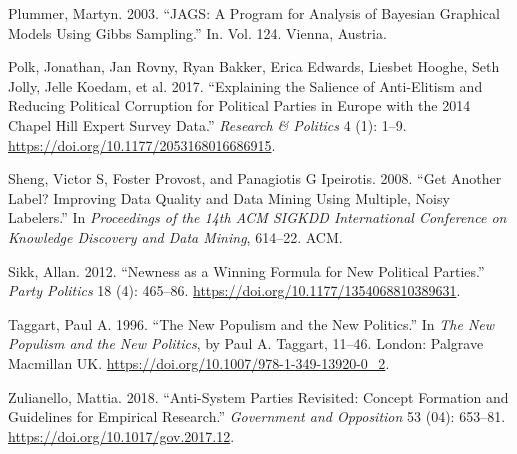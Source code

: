 \documentclass[12pt,]{article}
\begin{document}
\leavevmode\hypertarget{ref-plummer_jags_2003}{}%
Plummer, Martyn. 2003. ``JAGS: A Program for Analysis of Bayesian
Graphical Models Using Gibbs Sampling.'' In. Vol. 124. Vienna, Austria.

\leavevmode\hypertarget{ref-polk_explaining_2017}{}%
Polk, Jonathan, Jan Rovny, Ryan Bakker, Erica Edwards, Liesbet Hooghe,
Seth Jolly, Jelle Koedam, et al. 2017. ``Explaining the Salience of
Anti-Elitism and Reducing Political Corruption for Political Parties in
Europe with the 2014 Chapel Hill Expert Survey Data.'' \emph{Research \&
Politics} 4 (1): 1--9. \url{https://doi.org/10.1177/2053168016686915}.

\leavevmode\hypertarget{ref-sheng_get_2008}{}%
Sheng, Victor S, Foster Provost, and Panagiotis G Ipeirotis. 2008. ``Get
Another Label? Improving Data Quality and Data Mining Using Multiple,
Noisy Labelers.'' In \emph{Proceedings of the 14th ACM SIGKDD
International Conference on Knowledge Discovery and Data Mining},
614--22. ACM.

\leavevmode\hypertarget{ref-sikk_newness_2012}{}%
Sikk, Allan. 2012. ``Newness as a Winning Formula for New Political
Parties.'' \emph{Party Politics} 18 (4): 465--86.
\url{https://doi.org/10.1177/1354068810389631}.

\leavevmode\hypertarget{ref-taggart_new_1996}{}%
Taggart, Paul A. 1996. ``The New Populism and the New Politics.'' In
\emph{The New Populism and the New Politics}, by Paul A. Taggart,
11--46. London: Palgrave Macmillan UK.
\url{https://doi.org/10.1007/978-1-349-13920-0_2}.

\leavevmode\hypertarget{ref-zulianello_anti-system_2018}{}%
Zulianello, Mattia. 2018. ``Anti-System Parties Revisited: Concept
Formation and Guidelines for Empirical Research.'' \emph{Government and
Opposition} 53 (04): 653--81. \url{https://doi.org/10.1017/gov.2017.12}.




\newpage
\singlespacing 
\end{document}
